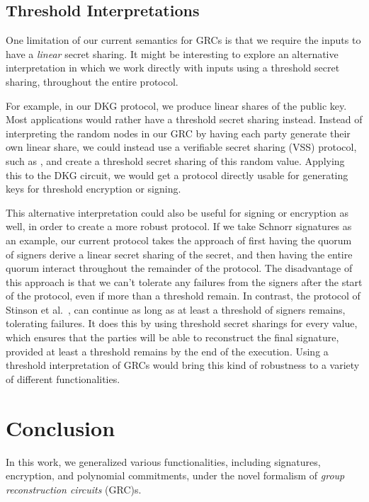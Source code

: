 \subsection{Threshold Interpretations}

One limitation of our current semantics for GRCs is that we require
the inputs to have a \emph{linear} secret sharing.
It might be interesting to explore an alternative interpretation
in which we work directly with inputs using a threshold secret sharing,
throughout the entire protocol.

For example, in our DKG protocol, we produce linear shares
of the public key.
Most applications would rather have a threshold secret sharing
instead.
Instead of interpreting the random nodes in our GRC
by having each party generate their own linear share, we could
instead use a verifiable secret sharing (VSS) protocol,
such as \cite{feldman_practical_1987}, and create a threshold
secret sharing of this random value.
Applying this to the DKG circuit, we would get a protocol
directly usable for generating keys for threshold encryption
or signing.

This alternative interpretation could also be useful
for signing or encryption as well, in order to create a more robust protocol.
If we take Schnorr signatures as an example,
our current protocol takes the approach of first having the quorum
of signers derive a linear secret sharing of the secret,
and then having the entire quorum interact throughout the remainder
of the protocol.
The disadvantage of this approach is that we can't tolerate
any failures from the signers after the start of the protocol,
even if more than a threshold remain.
In contrast, the protocol of Stinson et al.~\cite{stinson_provably_2001},
can continue as long as at least a threshold of signers
remains, tolerating failures.
It does this by using threshold secret sharings for every value,
which ensures that the parties will be able to reconstruct
the final signature, provided at least a threshold remains
by the end of the execution.
Using a threshold interpretation of GRCs would bring this
kind of robustness to a variety of different functionalities.

\section{Conclusion}

In this work, we generalized various functionalities, including
signatures, encryption, and polynomial commitments,
under the novel formalism of \emph{group reconstruction circuits} (GRC)s.

